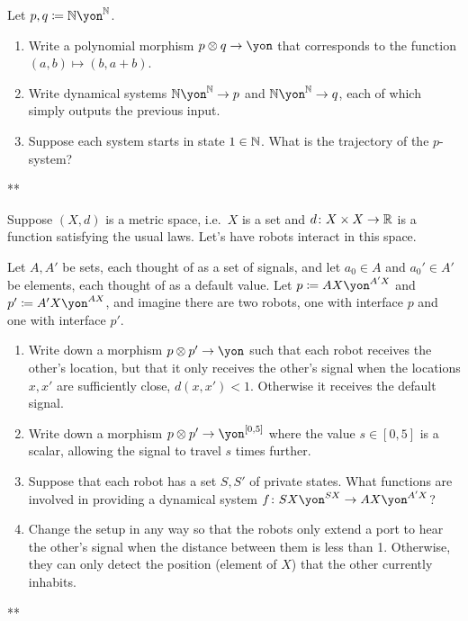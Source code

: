 \documentclass[Book-Poly]{subfiles}
\begin{document}
\begin{exercise}
Let $p,q\coloneqq\nn\yon^\nn$.
\begin{enumerate}
	\item Write a polynomial morphism $p\otimes q\to\yon$ that corresponds to the function $(a,b)\mapsto (b,a+b)$.
	\item Write dynamical systems $\nn\yon^\nn\to p$ and $\nn\yon^\nn\to q$, each of which simply outputs the previous input.
	\item Suppose each system starts in state $1\in\mathbb{N}$. What is the trajectory of the $p$-system?
\qedhere
\end{enumerate}
\begin{solution}
**
\end{solution}
\end{exercise}

\begin{exercise}
Suppose $(X,d)$ is a metric space, i.e.\ $X$ is a set and $d\colon X\times X\to\mathbb{R}$ is a function satisfying the usual laws. Let's have robots interact in this space.

Let $A,A'$ be sets, each thought of as a set of signals, and let $a_0\in A$ and $a_0'\in A'$ be elements, each thought of as a default value. Let $p\coloneqq AX\yon^{A'X}$ and $p'\coloneqq A'X\yon^{AX}$, and imagine there are two robots, one with interface $p$ and one with interface $p'$.
\begin{enumerate}
	\item Write down a morphism $p\otimes p'\to\yon$ such that each robot receives the other's location, but that it only receives the other's signal when the locations $x,x'$ are sufficiently close, $d(x,x')<1$. Otherwise it receives the default signal.
	\item Write down a morphism $p\otimes p'\to\yon^{[0,5]}$ where the value $s\in [0,5]$ is a scalar, allowing the signal to travel $s$ times further.
	\item Suppose that each robot has a set $S,S'$ of private states. What functions are involved in providing a dynamical system $f\colon SX\yon^{SX}\to AX\yon^{A'X}$?
	\item Change the setup in any way so that the robots only extend a port to hear the other's signal when the distance between them is less than 1. Otherwise, they can only detect the position (element of $X$) that the other currently inhabits.
\qedhere
\end{enumerate}
\begin{solution}
**
\end{solution}
\end{exercise}
\end{document}

